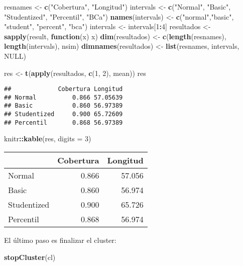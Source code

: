 \documentclass[
]{book}
\newenvironment{Shaded}{\begin{snugshade}}{\end{snugshade}}
\newcommand{\ControlFlowTok}[1]{\textcolor[rgb]{0.13,0.29,0.53}{\textbf{#1}}}
\newcommand{\DataTypeTok}[1]{\textcolor[rgb]{0.13,0.29,0.53}{#1}}
\newcommand{\DecValTok}[1]{\textcolor[rgb]{0.00,0.00,0.81}{#1}}
\newcommand{\KeywordTok}[1]{\textcolor[rgb]{0.13,0.29,0.53}{\textbf{#1}}}
\newcommand{\NormalTok}[1]{#1}
\newcommand{\OperatorTok}[1]{\textcolor[rgb]{0.81,0.36,0.00}{\textbf{#1}}}
\newcommand{\OtherTok}[1]{\textcolor[rgb]{0.56,0.35,0.01}{#1}}
\newcommand{\StringTok}[1]{\textcolor[rgb]{0.31,0.60,0.02}{#1}}
\theoremstyle{definition}
\theoremstyle{definition}
\theoremstyle{definition}
\theoremstyle{remark}
\begin{document}
\begin{Shaded}
\begin{Highlighting}[]
\NormalTok{resnames <-}\StringTok{ }\KeywordTok{c}\NormalTok{(}\StringTok{"Cobertura"}\NormalTok{, }\StringTok{"Longitud"}\NormalTok{)}
\NormalTok{intervals <-}\StringTok{ }\KeywordTok{c}\NormalTok{(}\StringTok{"Normal"}\NormalTok{, }\StringTok{"Basic"}\NormalTok{, }\StringTok{"Studentized"}\NormalTok{, }\StringTok{"Percentil"}\NormalTok{, }\StringTok{"BCa"}\NormalTok{)}
\KeywordTok{names}\NormalTok{(intervals) <-}\StringTok{ }\KeywordTok{c}\NormalTok{(}\StringTok{"normal"}\NormalTok{,}\StringTok{"basic"}\NormalTok{, }\StringTok{"student"}\NormalTok{, }\StringTok{"percent"}\NormalTok{, }\StringTok{"bca"}\NormalTok{)}
\NormalTok{intervals <-}\StringTok{ }\NormalTok{intervals[}\DecValTok{1}\OperatorTok{:}\DecValTok{4}\NormalTok{]}
\NormalTok{resultados <-}\StringTok{ }\KeywordTok{sapply}\NormalTok{(result, }\ControlFlowTok{function}\NormalTok{(x) x)}
\KeywordTok{dim}\NormalTok{(resultados) <-}\StringTok{ }\KeywordTok{c}\NormalTok{(}\KeywordTok{length}\NormalTok{(resnames), }\KeywordTok{length}\NormalTok{(intervals), nsim)}
\KeywordTok{dimnames}\NormalTok{(resultados) <-}\StringTok{ }\KeywordTok{list}\NormalTok{(resnames, intervals, }\OtherTok{NULL}\NormalTok{)}

\NormalTok{res <-}\StringTok{ }\KeywordTok{t}\NormalTok{(}\KeywordTok{apply}\NormalTok{(resultados, }\KeywordTok{c}\NormalTok{(}\DecValTok{1}\NormalTok{, }\DecValTok{2}\NormalTok{), mean))}
\NormalTok{res}
\end{Highlighting}
\end{Shaded}

\begin{verbatim}
##             Cobertura Longitud
## Normal          0.866 57.05639
## Basic           0.860 56.97389
## Studentized     0.900 65.72609
## Percentil       0.868 56.97389
\end{verbatim}

\begin{Shaded}
\begin{Highlighting}[]
\NormalTok{knitr}\OperatorTok{::}\KeywordTok{kable}\NormalTok{(res, }\DataTypeTok{digits =} \DecValTok{3}\NormalTok{)}
\end{Highlighting}
\end{Shaded}

\begin{tabular}{l|r|r}
\hline
  & Cobertura & Longitud\\
\hline
Normal & 0.866 & 57.056\\
\hline
Basic & 0.860 & 56.974\\
\hline
Studentized & 0.900 & 65.726\\
\hline
Percentil & 0.868 & 56.974\\
\hline
\end{tabular}

El último paso es finalizar el cluster:

\begin{Shaded}
\begin{Highlighting}[]
\KeywordTok{stopCluster}\NormalTok{(cl)}
\end{Highlighting}
\end{Shaded}

  
\end{document}
